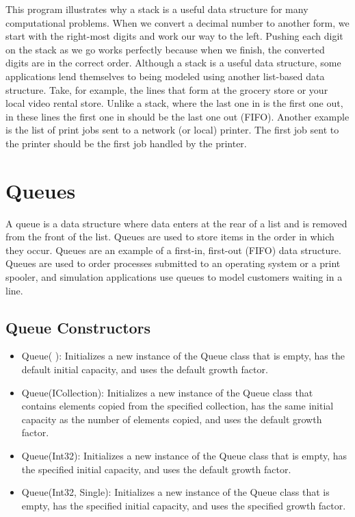 \documentclass[12pt,a4paper,final,twoside,titlepage]{book}
\begin{document}
This program illustrates why a stack is a useful data structure for many computational problems. When we convert a decimal number to another form, we start with the right-most digits and work our way to the left. Pushing each digit on the stack as we go works perfectly because when we finish, the converted digits are in the correct order.
Although a stack is a useful data structure, some applications lend themselves to being modeled using another list-based data structure. Take, for example, the lines that form at the grocery store or your local video rental store. Unlike a stack, where the last one in is the first one out, in these lines the first one in should be the last one out (FIFO). Another example is the list of print jobs sent to a network (or local) printer. The first job sent to the printer should be the first job handled by the printer.
\section{Queues}
A queue is a data structure where data enters at the rear of a list and is removed from the front of the list. Queues are used to store items in the order in which they occur. Queues are an example of a first-in, first-out (FIFO) data structure. Queues are used to order processes submitted to an operating system or a print spooler, and simulation applications use queues to model customers waiting in a line.
\subsection{Queue Constructors}
\begin{itemize}
\item Queue( ): Initializes a new instance of the Queue class that is empty, has the default initial capacity, and uses the default growth factor.
\item Queue(ICollection): Initializes a new instance of the Queue class that contains elements copied from the specified collection, has the same initial capacity as the number of elements copied, and uses the default growth factor.
\item Queue(Int32): Initializes a new instance of the Queue class that is empty, has the specified initial capacity, and uses the default growth factor.
\item Queue(Int32, Single): Initializes a new instance of the Queue class that is empty, has the specified initial capacity, and uses the specified growth factor.
\end{itemize}
\end{document}
